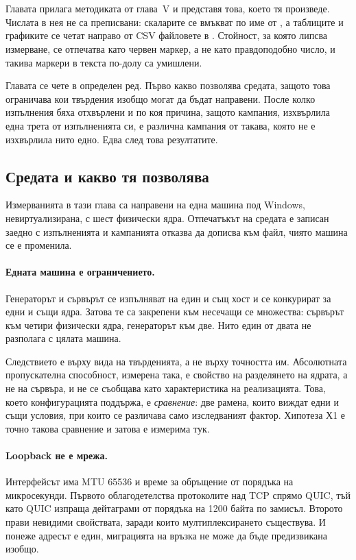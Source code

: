 \section{}

Главата прилага методиката от глава~V и представя това, което тя произведе. Числата в нея
не са преписвани: скаларите се вмъкват по име от , а таблиците и
графиките се четат направо от CSV файловете в . Стойност, за която липсва
измерване, се отпечатва като червен маркер, а не като правдоподобно число, и такива маркери
в текста по-долу са умишлени.

Главата се чете в определен ред. Първо какво позволява средата, защото това ограничава кои
твърдения изобщо могат да бъдат направени. После колко изпълнения бяха отхвърлени и по коя
причина, защото кампания, изхвърлила една трета от изпълненията си, е различна кампания от
такава, която не е изхвърлила нито едно. Едва след това резултатите.

\subsection{Средата и какво тя позволява}
\label{sec:env}

Измерванията в тази глава са направени на една машина под Windows, невиртуализирана, с
шест физически ядра. Отпечатъкът на средата е записан заедно с изпълненията и кампанията
отказва да дописва към файл, чиято машина се е променила.

\paragraph{Едната машина е ограничението.} Генераторът и сървърът се изпълняват на един и
същ хост и се конкурират за едни и същи ядра. Затова те са закрепени към несечащи се
множества: сървърът към четири физически ядра, генераторът към две. Нито един от двата не
разполага с цялата машина.

Следствието е върху вида на твърденията, а не върху точността им. Абсолютната пропускателна
способност, измерена така, е свойство на разделянето на ядрата, а не на сървъра, и не се
съобщава като характеристика на реализацията. Това, което конфигурацията поддържа, е
\emph{сравнение}: две рамена, които виждат едни и същи условия, при които се различава само
изследваният фактор. Хипотеза Х1 е точно такова сравнение и затова е измерима тук.

\paragraph{Loopback не е мрежа.} Интерфейсът има MTU 65536 и време за обръщение от порядъка
на микросекунди. Първото облагодетелства протоколите над TCP спрямо QUIC, тъй като QUIC
изпраща дейтаграми от порядъка на 1200 байта по замисъл. Второто прави невидими свойствата,
заради които мултиплексирането съществува. И понеже адресът е един, миграцията на връзка не
може да бъде предизвикана изобщо.

